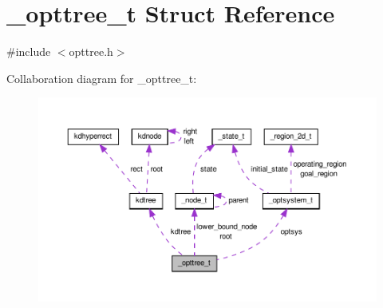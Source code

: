 \hypertarget{a00005}{\section{\-\_\-opttree\-\_\-t \-Struct \-Reference}
\label{dd/dad/a00005}
}


{\ttfamily \#include $<$opttree.\-h$>$}



\-Collaboration diagram for \-\_\-opttree\-\_\-t\-:\nopagebreak
\begin{figure}[H]
\begin{center}
\leavevmode
\includegraphics[width=350pt]{d1/dc6/a00037}
\end{center}
\end{figure}
